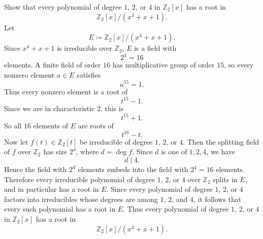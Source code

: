 \begin{problem}{
    Show that every polynomial of degree $1$, $2$, or $4$ in $\mathbb{Z}_2[x]$ has a root in
    \[
        \mathbb{Z}_2[x]/(x^4+x+1).
    \]
}
    Let
    \[
        E\coloneqq \mathbb{Z}_2[x]/(x^4+x+1).
    \]
    Since $x^4+x+1$ is irreducible over $\mathbb{Z}_2$, $E$ is a field with
    \[
        2^4=16
    \]
    elements.
    A finite field of order $16$ has multiplicative group of order $15$, so every nonzero element $a\in E$ satisfies
    \[
        a^{15}=1.
    \]
    Thus every nonzero element is a root of
    \[
        t^{15}-1.
    \]
    Since we are in characteristic $2$, this is
    \[
        t^{15}+1.
    \]
    So all $16$ elements of $E$ are roots of
    \[
        t^{16}-t.
    \]
    Now let $f(t)\in\mathbb{Z}_2[t]$ be irreducible of degree $1$, $2$, or $4$.
    Then the splitting field of $f$ over $\mathbb{Z}_2$ has size $2^d$, where $d=\deg f$.
    Since $d$ is one of $1,2,4$, we have
    \[
        d\mid 4.
    \]
    Hence the field with $2^d$ elements embeds into the field with $2^4=16$ elements.
    Therefore every irreducible polynomial of degree $1$, $2$, or $4$ over $\mathbb{Z}_2$ splits in $E$, and in particular has a root in $E$.
    Since every polynomial of degree $1$, $2$, or $4$ factors into irreducibles whose degrees are among $1$, $2$, and $4$, it follows that every such polynomial has a root in $E$.
    Thus every polynomial of degree $1$, $2$, or $4$ in $\mathbb{Z}_2[x]$ has a root in
    \[
        \mathbb{Z}_2[x]/(x^4+x+1).
    \]
\end{problem}